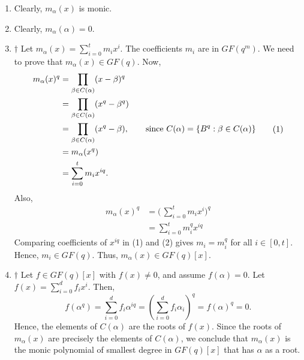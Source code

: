 \begin{Proof}{}{} \;
    \begin{enumerate}[label=(\roman*)]
        \item Clearly, $ m_\alpha(x) $ is monic.
        \item Clearly, $ m_\alpha(\alpha)=0 $.
        \item $ \dagger $ Let $ m_\alpha(x)=\sum\limits_{i=0}^{t} m_i x^i $.
              The coefficients $ m_i $ are in $ GF(q^m) $. We need to prove that
              $ m_\alpha(x)\in GF(q) $. Now,
              \begin{equation}
                  \begin{aligned}
                      m_\alpha(x)^q
                       & =\prod_{\beta\in C(\alpha)}(x-\beta)^q                                                            \\
                       & =\prod_{\beta\in C(\alpha)}(x^q-\beta^q)                                                          \\
                       & =\prod_{\beta\in C(\alpha)}(x^q-\beta),\qquad \text{since }C(\alpha)=\{B^q:\beta\in C(\alpha)\} \\
                       & =m_\alpha(x^q)                                                                                    \\
                       & =\sum\limits_{i=0}^{t} m_i x^{iq}.
                  \end{aligned}\tag{1}
              \end{equation}
              Also,
              \begin{equation}
                  \begin{aligned}
                      m_\alpha(x)^q
                       & =\biggl(\, \sum\limits_{i=0}^{t} m_i x^i \biggr)^q \\
                       & = \sum\limits_{i=0}^{t} m_i^q x^{iq}
                  \end{aligned}\tag{2}
              \end{equation}
              Comparing coefficients of $ x^{iq} $ in (1) and (2) gives $ m_i=m_i^q $
              for all $ i\in[0,t] $. Hence, $ m_i\in GF(q) $. Thus, $ m_\alpha(x)\in GF(q)[x] $.
        \item $ \dagger $ Let $ f\in GF(q)[x] $ with $ f(x)\neq 0 $, and assume $ f(\alpha)=0 $.
              Let $ f(x)=\sum\limits_{i=0}^{d} f_i x^i $. Then,
              \[ f(\alpha^q)=\sum\limits_{i=0}^{d} f_i\alpha^{iq}=
                  \left( \sum\limits_{i=0}^{d} f_i\alpha_i \right)^q=f(\alpha)^q=0. \]
              Hence, the elements of $ C(\alpha) $ are the roots of $ f(x) $. Since the roots
              of $ m_\alpha(x) $ are precisely the elements of $ C(\alpha) $, we conclude
              that $ m_\alpha(x) $ is the monic polynomial of smallest degree in $ GF(q)[x] $
              that has $ \alpha $ as a root.
    \end{enumerate}
\end{Proof}

